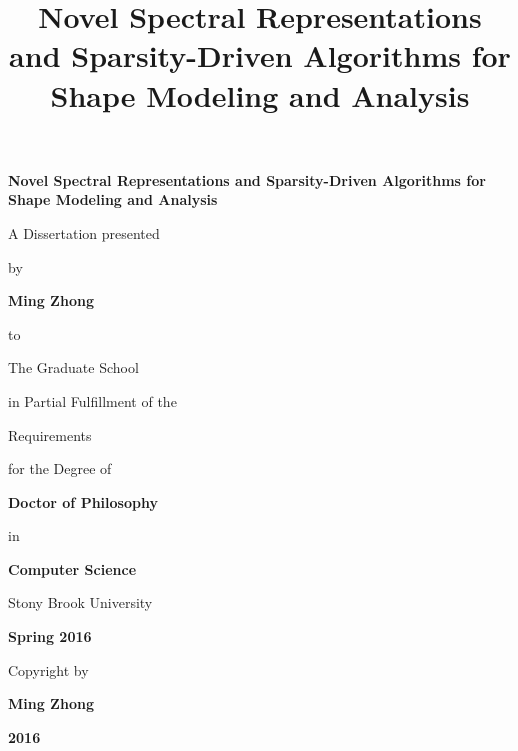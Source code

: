 \documentclass[12pt,letterpaper,twosided]{report}
\numberwithin{equation}{section}
\begin{document}
\title{\bf{Novel Spectral Representations and
Sparsity-Driven Algorithms for Shape Modeling and Analysis}}

\vspace*{3\baselineskip}
\begin{center}
{\bf\Large Novel Spectral Representations and
Sparsity-Driven Algorithms for Shape Modeling and Analysis}
\end{center}
\vspace*{3\baselineskip}
\centerline{A Dissertation presented}
\vspace*{1\baselineskip}
\centerline{by}
\vspace*{1\baselineskip}
\centerline{\bf{Ming Zhong}}
\vspace*{1\baselineskip}
\centerline{to}
\vspace*{1\baselineskip}
\centerline{The Graduate School}
\vspace*{1\baselineskip}
\centerline{in Partial Fulfillment of the}
\vspace*{1\baselineskip}
\centerline{Requirements}
\vspace*{1\baselineskip}
\centerline{for the Degree of}
\vspace*{1\baselineskip}
\centerline{\bf{Doctor of Philosophy}}
\vspace*{1\baselineskip}
\centerline{in}
\vspace*{1\baselineskip}
\centerline{\bf{Computer Science}}
\vspace*{2\baselineskip}
\centerline{Stony Brook University}
\vspace*{2\baselineskip}
\centerline{\bf{Spring 2016}}

\newpage
{}

\vspace*{32\baselineskip}
\centerline{Copyright by}
\centerline{\bf{Ming Zhong}}
\centerline{\bf{2016}}

\newpage
{}
\setcounter{page}{2}
\end{document}
